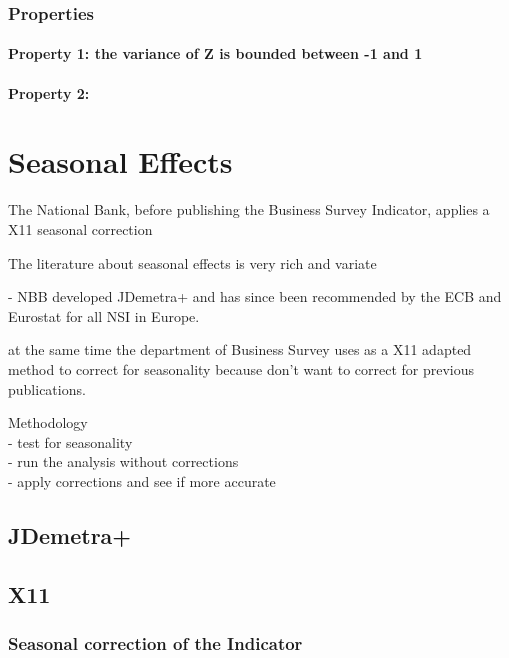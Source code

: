 \documentclass[12pt,a4paper,oneside]{book}
\begin{document}
\subsection{Properties}

\subsubsection{Property 1: the variance of Z is bounded between -1 and 1}


\subsubsection{Property 2: }





\chapter{Seasonal Effects}
The National Bank, before publishing the Business Survey Indicator, applies a X11 seasonal correction

The literature about seasonal effects is very rich and variate

- NBB developed JDemetra+ and has since been recommended by the ECB and Eurostat for all NSI in Europe.


at the same time the department of Business Survey uses as a X11 adapted method to correct for seasonality because don't want to correct for previous publications.


Methodology \\
- test for seasonality \\
- run the analysis without corrections \\
- apply corrections and see if more accurate \\


\section{JDemetra+}

\section{X11}

\subsection{Seasonal correction of the Indicator}
\end{document}

